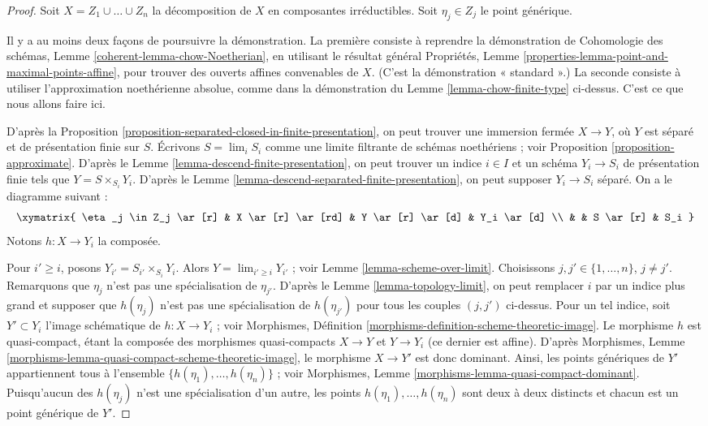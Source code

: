 \begin{proof}
Soit $X = Z_1 \cup \ldots \cup Z_n$ la décomposition de $X$
en composantes irréductibles. Soit $\eta_j \in Z_j$ le point générique.

\medskip\noindent
Il y a au moins deux façons de poursuivre la démonstration.
La première consiste à reprendre la démonstration de
Cohomologie des schémas, Lemme \ref{coherent-lemma-chow-Noetherian},
en utilisant le résultat général
Propriétés, Lemme \ref{properties-lemma-point-and-maximal-points-affine},
pour trouver des ouverts affines convenables de $X$. (C'est la démonstration « standard ».)
La seconde consiste à utiliser l'approximation noethérienne absolue, comme dans
la démonstration du Lemme \ref{lemma-chow-finite-type} ci-dessus.
C'est ce que nous allons faire ici.

\medskip\noindent
D'après la Proposition \ref{proposition-separated-closed-in-finite-presentation},
on peut trouver une immersion fermée $X \to Y$, où $Y$ est séparé
et de présentation finie sur $S$.
Écrivons $S = \lim_i S_i$ comme une limite filtrante de schémas noethériens ; voir
Proposition \ref{proposition-approximate}. D'après le
Lemme \ref{lemma-descend-finite-presentation}, on peut
trouver un indice $i \in I$ et un schéma $Y_i \to S_i$ de présentation finie
tels que $Y = S \times_{S_i} Y_i$.
D'après le Lemme \ref{lemma-descend-separated-finite-presentation},
on peut supposer $Y_i \to S_i$ séparé.
On a le diagramme suivant :
$$
\xymatrix{
\eta_j \in Z_j \ar[r] & X \ar[r] \ar[rd] & Y \ar[r] \ar[d] & Y_i \ar[d] \\
& & S \ar[r] & S_i
}
$$
Notons $h : X \to Y_i$ la composée.

\medskip\noindent
Pour $i' \geq i$, posons $Y_{i'} = S_{i'} \times_{S_i} Y_i$.
Alors $Y = \lim_{i' \geq i} Y_{i'}$ ; voir
Lemme \ref{lemma-scheme-over-limit}.
Choisissons $j, j' \in \{1, \ldots, n\}$, $j \not = j'$.
Remarquons que $\eta_j$ n'est pas une spécialisation de $\eta_{j'}$.
D'après le Lemme \ref{lemma-topology-limit},
on peut remplacer $i$ par un indice plus grand et supposer
que $h(\eta_j)$ n'est pas une spécialisation de $h(\eta_{j'})$
pour tous les couples $(j, j')$ ci-dessus.
Pour un tel indice, soit
$Y' \subset Y_i$ l'image schématique de
$h : X \to Y_i$ ; voir
Morphismes, Définition \ref{morphisms-definition-scheme-theoretic-image}.
Le morphisme $h$ est quasi-compact, étant la composée des morphismes quasi-compacts
$X \to Y$ et $Y \to Y_i$ (ce dernier est affine).
D'après
Morphismes, Lemme \ref{morphisms-lemma-quasi-compact-scheme-theoretic-image},
le morphisme $X \to Y'$ est donc dominant. Ainsi, les points génériques
de $Y'$ appartiennent tous à l'ensemble
$\{h(\eta_1), \ldots, h(\eta_n)\}$ ; voir
Morphismes, Lemme \ref{morphisms-lemma-quasi-compact-dominant}.
Puisqu'aucun des $h(\eta_j)$ n'est une spécialisation d'un autre,
les points $h(\eta_1), \ldots, h(\eta_n)$ sont deux à deux
distincts et chacun est un point générique de $Y'$.


\end{proof}
